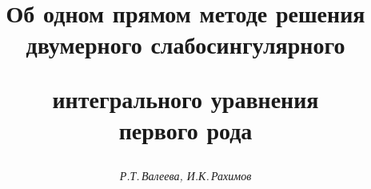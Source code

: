 

 


% 


 


\newcommand{\const}{\operatorname{const}} 


\newcommand{\tts}[1]{} 


 




 


\setcounter{page}{3} 












 


\author{\it Р.Т.\,Валеева, И.К.\,Рахимов} 




\title{Об одном прямом методе решения двумерного слабосингулярного 


интегрального уравнения\\ первого рода} 


 


\date{} 




\pagestyle{plain} %


 




\maketitle 


